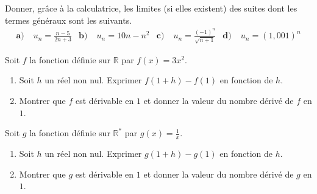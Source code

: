 \documentclass[11pt]{article}
\begin{document}
\begin{exo}
 Donner, gr\^ace à la calculatrice, les limites (si elles existent) des suites
 dont les termes généraux sont les suivants. 
 \begin{align*}
   \textbf{a)}\;& u_n = \frac{n - 5}{2n+3} &
   \textbf{b)}\;& u_n = 10n - n^2 &
   \textbf{c)}\;& u_n = \frac{(-1)^n}{\sqrt{n+1}} &
   \textbf{d)}\;& u_n = (1,001)^n
 \end{align*}
\end{exo}

\begin{exo}[Dérivation]
  Soit $f$ la fonction définie sur $\mathbb{R}$ par $f(x) = 3x^2$.
  \begin{enumerate}
    \item Soit $h$ un réel non nul. Exprimer $f(1+h)-f(1)$ en fonction de $h$.
    \item Montrer que $f$ est dérivable en $1$ et donner la valeur du nombre
      dérivé de $f$ en $1$.
  \end{enumerate}
\end{exo}

\begin{exo}[Dérivation]
  Soit $g$ la fonction définie sur $\mathbb{R}^*$ par $g(x) = \frac{1}{x}$.
  \begin{enumerate}
    \item Soit $h$ un réel non nul. Exprimer $g(1+h)-g(1)$ en fonction de $h$.
    \item Montrer que $g$ est dérivable en $1$ et donner la valeur du nombre
      dérivé de $g$ en $1$.
  \end{enumerate}
\end{exo}
\end{document}
